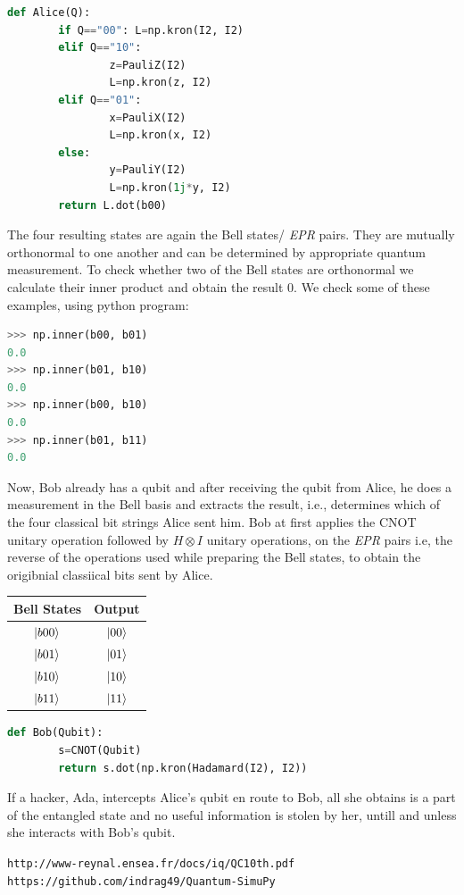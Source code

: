 \documentclass{article}
\begin{document}
\begin{lstlisting}[language=Python, frame=single]
def Alice(Q):
        if Q=="00": L=np.kron(I2, I2)
        elif Q=="10":
                z=PauliZ(I2)
                L=np.kron(z, I2)
        elif Q=="01":
                x=PauliX(I2)
                L=np.kron(x, I2)
        else:
                y=PauliY(I2)
                L=np.kron(1j*y, I2)
        return L.dot(b00)
\end{lstlisting} 
The four resulting states are again the Bell states/ \textit{EPR} pairs. They are mutually orthonormal to one another and can be determined by appropriate quantum measurement. To check whether two of the Bell states are orthonormal we calculate their inner product  and obtain the result 0. We check some of these examples, using python program:\\ \par

\begin{lstlisting}[language=Python, frame=single]
>>> np.inner(b00, b01)
0.0
>>> np.inner(b01, b10)
0.0
>>> np.inner(b00, b10)
0.0
>>> np.inner(b01, b11)
0.0
\end{lstlisting} 

Now, Bob already has a qubit and after receiving the qubit from Alice, he does a measurement in the Bell basis and extracts the result, i.e., determines which of the four classical bit strings Alice sent him. Bob at first  applies the CNOT unitary operation followed by $H \otimes I$ unitary operations, on the \textit{EPR} pairs i.e, the reverse of the operations used while preparing the Bell states, to obtain the origibnial classiical bits sent by Alice.\\ \par
\begin{center}
\begin{tabular}{||c c||}
\hline
Bell States & Output\\[0.5ex]
\hline
\hline
$\ket{b00}$ & $\ket{00}$ \\
\hline
\hline
$\ket{b01}$ & $\ket{01}$ \\
\hline
\hline
$\ket{b10}$ & $\ket{10}$ \\
\hline
\hline
$\ket{b11}$ & $\ket{11}$ \\
\hline
\end{tabular}
\end{center}
 \begin{lstlisting}[language=Python, frame=single]
def Bob(Qubit):
        s=CNOT(Qubit)
        return s.dot(np.kron(Hadamard(I2), I2))
\end{lstlisting} 

If a hacker, Ada, intercepts Alice's qubit en route to Bob, all she obtains is a part of the entangled state and no useful information is stolen by her, untill and unless she interacts with Bob's qubit.
\begin{thebibliography}{9}
\texttt{http://www-reynal.ensea.fr/docs/iq/QC10th.pdf}
\texttt{https://github.com/indrag49/Quantum-SimuPy}
\end{thebibliography}
\end{document}
